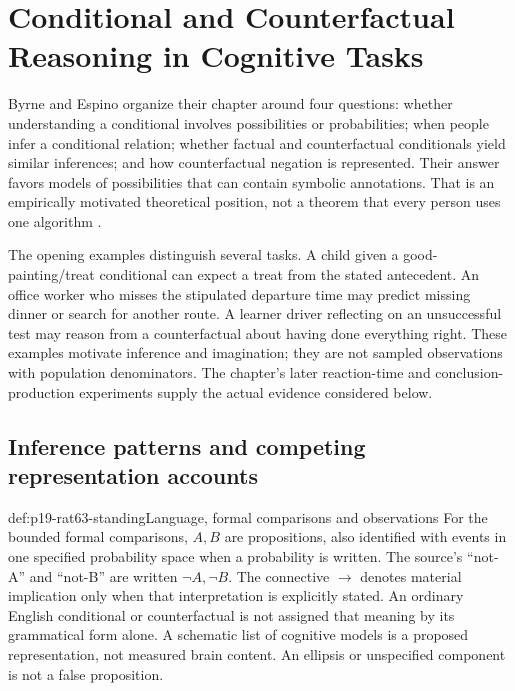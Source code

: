 \chapter{Conditional and Counterfactual Reasoning in Cognitive Tasks}
\label{sec:p19-rationality-6-3}

Byrne and Espino organize their chapter around four questions: whether
understanding a conditional involves possibilities or probabilities;
when people infer a conditional relation; whether factual and counterfactual
conditionals yield similar inferences; and how counterfactual negation is
represented. Their answer favors models of possibilities that can contain
symbolic annotations. That is an empirically motivated theoretical
position, not a theorem that every person uses one algorithm
\cite[chapter~6.3, pp.~405--418]{ByrneEspino2021ConditionalCounterfactual}.

The opening examples distinguish several tasks. A child given a
good-painting/treat conditional can expect a treat from the stated
antecedent. An office worker who misses the stipulated departure time
may predict missing dinner or search for another route. A learner driver
reflecting on an unsuccessful test may reason from a counterfactual
about having done everything right. These examples motivate inference
and imagination; they are not sampled observations with population
denominators. The chapter's later reaction-time and conclusion-production
experiments supply the actual evidence considered below.

\section{Inference patterns and competing representation accounts}
\label{sec:p19-rat63-accounts}

\begin{hbconvention}{def:p19-rat63-standing}{Language, formal comparisons and observations}
For the bounded formal comparisons, \(A,B\) are propositions, also
identified with events in one specified probability space when a
probability is written. The source's ``not-A'' and ``not-B'' are
written \(\neg A,\neg B\). The connective \(\to\) denotes
material implication only when that interpretation is explicitly stated.
An ordinary English conditional or counterfactual is not assigned that
meaning by its grammatical form alone. A schematic list of cognitive
models is a proposed representation, not measured brain content.
An ellipsis or unspecified component is not a false proposition.
\end{hbconvention}

